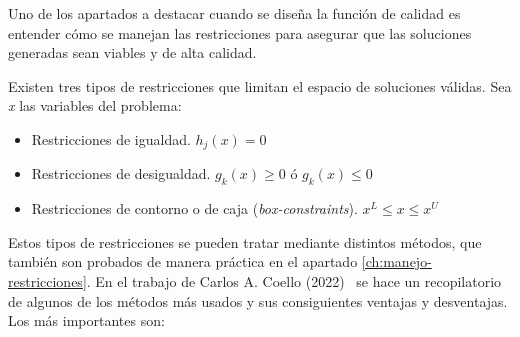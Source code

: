 Uno de los apartados a destacar cuando se diseña la función de calidad es entender cómo se manejan las restricciones para asegurar que las soluciones generadas sean viables y de alta calidad.

Existen tres tipos de restricciones que limitan el espacio de soluciones válidas. Sea \textit{x} las variables del problema:

\begin{itemize}
  \item Restricciones de igualdad. $h_j(x) = 0$
  \item Restricciones de desigualdad. $g_k(x) \geq 0$ ó $g_k(x) \leq 0$
  \item Restricciones de contorno o de caja (\textit{box-constraints}). $x^L \leq x \leq x^U$
\end{itemize}

Estos tipos de restricciones se pueden tratar mediante distintos métodos, que también son probados de manera práctica en el apartado \ref{ch:manejo-restricciones}. En el trabajo de Carlos A. Coello (2022)~\cite{coello2022} se hace un recopilatorio de algunos de los métodos más usados y sus consiguientes ventajas y desventajas. Los más importantes son:

